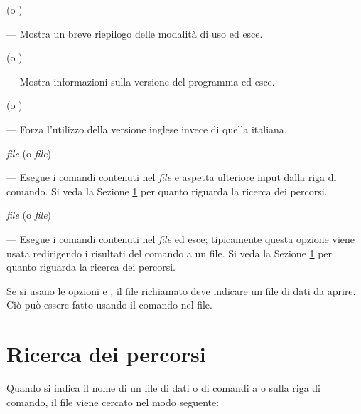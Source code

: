  (o )

--- Mostra un breve riepilogo delle modalità di uso ed esce.
      
 (o )

--- Mostra informazioni sulla versione del programma ed esce.
      
 (o )

--- Forza l'utilizzo della versione inglese invece di quella italiana.
      
 \textsl{file} (o  \textsl{file})

--- Esegue i comandi contenuti nel \textsl{file} e aspetta ulteriore
input dalla riga di comando.  Si veda la Sezione \ref{path-search} per
quanto riguarda la ricerca dei percorsi.

 \textsl{file} (o 
\textsl{file})

--- Esegue i comandi contenuti nel \textsl{file} ed esce; tipicamente
questa opzione viene usata redirigendo i risultati del comando a un
file.  Si veda la Sezione \ref{path-search} per quanto riguarda la
ricerca dei percorsi.

Se si usano le opzioni  e , il file richiamato
deve indicare un file di dati da aprire. Ciò può essere fatto usando
il comando  nel file.


\section{Ricerca dei percorsi}
\label{path-search}

Quando si indica il nome di un file di dati o di comandi a 
o  sulla riga di comando, il file viene cercato nel modo
seguente:
      
